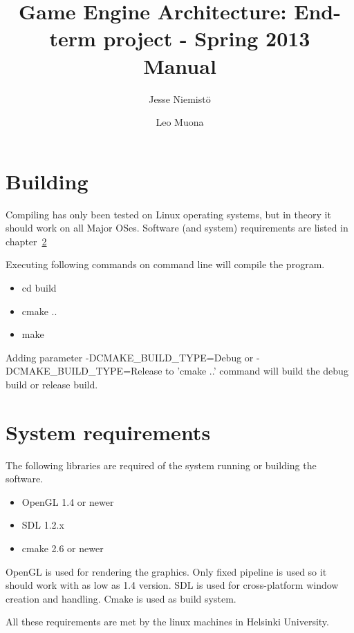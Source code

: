 \documentclass[11pt,twoside,a4paper]{article}
\begin{document}
\author{Jesse Niemistö \and Leo Muona}
\title{Game Engine Architecture: End-term project - Spring 2013 \\
       Manual}

\maketitle

\section{Building}
\label{sec:building}

Compiling has only been tested on Linux operating systems, but in theory it should work on all Major OSes. Software (and system) requirements are listed in chapter~\ref{sec:system_requirements}

Executing following commands on command line will compile the program.

\begin{itemize}
  \item cd build
  \item cmake ..
  \item make
\end{itemize}

Adding parameter -DCMAKE\_BUILD\_TYPE=Debug or -DCMAKE\_BUILD\_TYPE=Release to 'cmake ..' command will build the debug build or release build.

\section{System requirements}
\label{sec:system_requirements}

The following libraries are required of the system running or building the software.

\begin{itemize}
  \item OpenGL 1.4 or newer
  \item SDL 1.2.x
  \item cmake 2.6 or newer
\end{itemize}

OpenGL is used for rendering the graphics. Only fixed pipeline is used so it should work with as low as 1.4 version. SDL is used for cross-platform window creation and handling. Cmake is used as build system.

All these requirements are met by the linux machines in Helsinki University.
\end{document}
